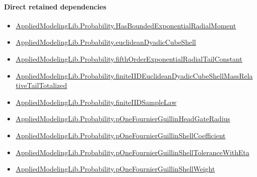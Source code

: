 \documentclass[10pt]{article}
\begin{document}
\paragraph{Direct retained dependencies}
\begin{itemize}\raggedright
\item \hyperlink{governing-declaration-9604ed56aea35d91}{Applied\allowbreak{}Modeling\allowbreak{}Lib.\allowbreak{}Probability.\allowbreak{}Has\allowbreak{}Bounded\allowbreak{}Exponential\allowbreak{}Radial\allowbreak{}Moment}
\item \hyperlink{governing-declaration-13cdf9a43259c30a}{Applied\allowbreak{}Modeling\allowbreak{}Lib.\allowbreak{}Probability.\allowbreak{}euclidean\allowbreak{}Dyadic\allowbreak{}Cube\allowbreak{}Shell}
\item \hyperlink{governing-declaration-93c495b865c4b878}{Applied\allowbreak{}Modeling\allowbreak{}Lib.\allowbreak{}Probability.\allowbreak{}fifth\allowbreak{}Order\allowbreak{}Exponential\allowbreak{}Radial\allowbreak{}Tail\allowbreak{}Constant}
\item \hyperlink{governing-declaration-dbd328d5a293e61c}{Applied\allowbreak{}Modeling\allowbreak{}Lib.\allowbreak{}Probability.\allowbreak{}finite\allowbreak{}IID\allowbreak{}Euclidean\allowbreak{}Dyadic\allowbreak{}Cube\allowbreak{}Shell\allowbreak{}Mass\allowbreak{}Relative\allowbreak{}Tail\allowbreak{}Totalized}
\item \hyperlink{governing-declaration-91a777e8ba845265}{Applied\allowbreak{}Modeling\allowbreak{}Lib.\allowbreak{}Probability.\allowbreak{}finite\allowbreak{}IID\allowbreak{}Sample\allowbreak{}Law}
\item \hyperlink{governing-declaration-c6ed5828a32d7abc}{Applied\allowbreak{}Modeling\allowbreak{}Lib.\allowbreak{}Probability.\allowbreak{}p\allowbreak{}One\allowbreak{}Fournier\allowbreak{}Guillin\allowbreak{}Head\allowbreak{}Gate\allowbreak{}Radius}
\item \hyperlink{governing-declaration-1dd6dc54de4dcd4f}{Applied\allowbreak{}Modeling\allowbreak{}Lib.\allowbreak{}Probability.\allowbreak{}p\allowbreak{}One\allowbreak{}Fournier\allowbreak{}Guillin\allowbreak{}Shell\allowbreak{}Coefficient}
\item \hyperlink{governing-declaration-1b744d1c0d378e63}{Applied\allowbreak{}Modeling\allowbreak{}Lib.\allowbreak{}Probability.\allowbreak{}p\allowbreak{}One\allowbreak{}Fournier\allowbreak{}Guillin\allowbreak{}Shell\allowbreak{}Tolerance\allowbreak{}With\allowbreak{}Eta}
\item \hyperlink{governing-declaration-831786d365674bcf}{Applied\allowbreak{}Modeling\allowbreak{}Lib.\allowbreak{}Probability.\allowbreak{}p\allowbreak{}One\allowbreak{}Fournier\allowbreak{}Guillin\allowbreak{}Shell\allowbreak{}Weight}
\end{itemize}
\hypertarget{governing-declaration-beaaebb5e90384d4}{}
\end{document}
